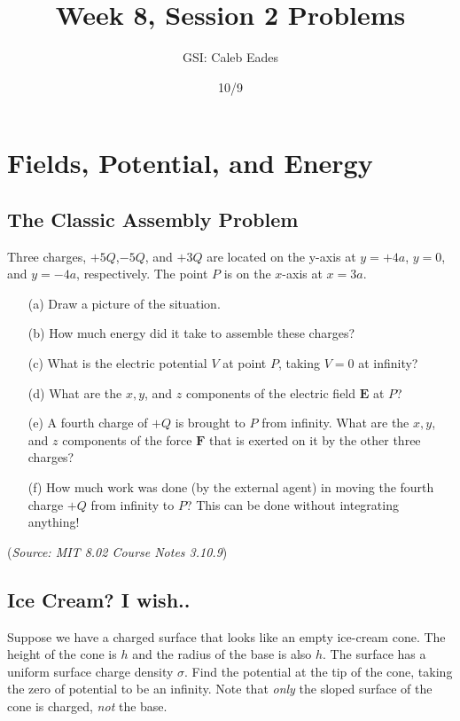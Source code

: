 \documentclass{article}
\begin{document}
\title{Week 8, Session 2 Problems}
\author{GSI: Caleb Eades}
\date{10/9}
\maketitle

\section{Fields, Potential, and Energy}

\subsection{The Classic Assembly Problem}

Three charges, $+5Q$,$-5Q$, and $+3Q$ are located on the y-axis at $y= +4a$, $y= 0$, and $y=-4a$, respectively. The point $P$ is on the $x$-axis at $x=3a$.
\begin{itemize}
	\item[(a)] Draw a picture of the situation.
	\item[(b)] How much energy did it take to assemble these charges?
	\item[(c)] What is the electric potential $V$ at point $P$, taking $V= 0$ at infinity?
	\item[(d)] What are the $x,y$, and $z$ components of the electric field $\mathbf{E}$ at $P$?
	\item[(e)] A fourth charge of $+Q$ is brought to $P$ from infinity. What are the $x,y$, and $z$ components of the force $\mathbf{F}$ that is exerted on it by the other three charges?
	\item[(f)] How much work was done (by the external agent) in moving the fourth charge $+Q$ from infinity to $P$? This can be done without integrating anything!
\end{itemize}

(\textit{Source: MIT 8.02 Course Notes 3.10.9})

\subsection{Ice Cream? I wish..}

Suppose we have a charged surface that looks like an empty ice-cream cone. The height of the cone is $h$ and the radius of the base is also $h$. The surface has a uniform surface charge density $\sigma$. Find the potential at the tip of the cone, taking the zero of potential to be an infinity. Note that \textit{only} the sloped surface of the cone is charged, \textit{not} the base.
\end{document}
